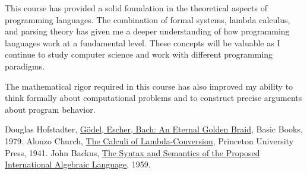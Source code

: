 \documentclass{article}
\theoremstyle{plain}
\theoremstyle{definition}
\theoremstyle{remark}
\begin{document}
This course has provided a solid foundation in the theoretical aspects of programming languages. The combination of formal systems, lambda calculus, and parsing theory has given me a deeper understanding of how programming languages work at a fundamental level. These concepts will be valuable as I continue to study computer science and work with different programming paradigms.

The mathematical rigor required in this course has also improved my ability to think formally about computational problems and to construct precise arguments about program behavior.

\begin{thebibliography}{99}
 Douglas Hofstadter, \href{https://en.wikipedia.org/wiki/G%C3%B6del,_Escher,_Bach}{Gödel, Escher, Bach: An Eternal Golden Braid}, Basic Books, 1979.
 Alonzo Church, \href{https://en.wikipedia.org/wiki/Lambda_calculus}{The Calculi of Lambda-Conversion}, Princeton University Press, 1941.
 John Backus, \href{https://en.wikipedia.org/wiki/Backus%E2%80%93Naur_form}{The Syntax and Semantics of the Proposed International Algebraic Language}, 1959.
\end{thebibliography}
\end{document}
